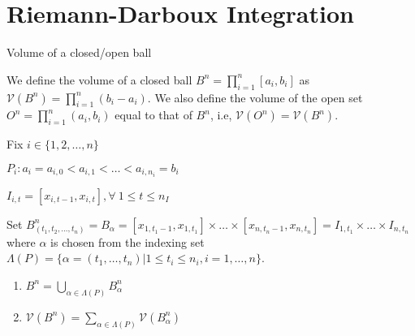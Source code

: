 \documentclass[a4paper]{article}
\begin{document}

\section{Riemann-Darboux Integration}



\begin{Def}{Volume of a closed/open ball}{}

  We define the volume of a closed ball $B^n = \prod \limits_{i=1}^n [a_i, b_i]$ as $\mathcal{V}(B^n) = \prod \limits_{i=1}^n (b_i - a_i).$ We also define the volume of the open set $O^n = \prod \limits _{i=1}^n (a_i, b_i)$ equal to that of $B^n$, i.e, $\mathcal{V}(O^n) = \mathcal{V}(B^n)$.

\end{Def}

\begin{notnBox}

  Fix $i \in \{1,2, \dots, n\}$

  $P_i: a_i = a_{i,0} < a_{i,1} < \dots < a_{i,n_i} = b_i$

  $I_{i,t} = [x_{i,t-1}, x_{i,t}], \forall \ 1 \leq t \leq n_I$

  Set $B_{(t_1,t_2,\dots ,t_n)}^n = B_\alpha = [x_{1,t_1-1}, x_{1,t_1}] \times \dots \times [x_{n,t_n-1}, x_{n,t_n}] = I_{1,t_1} \times \dots \times I_{n,t_n}$ where $\alpha$ is chosen from the indexing set $\Lambda (P) = \{\alpha = (t_1,\dots ,t_n) | 1 \leq t_i \leq n_i, i=1, \dots , n\}$.


\end{notnBox}

\begin{noteBox}

  \begin{enumerate}
    \item $B^n = \bigcup \limits _{\alpha \in \Lambda (P)} B^n_\alpha$
    \item $\mathcal{V}(B^n) = \sum \limits _{\alpha \in \Lambda (P)} \mathcal{V}(B_\alpha ^n)$
  \end{enumerate}

\end{noteBox}
\end{document}
